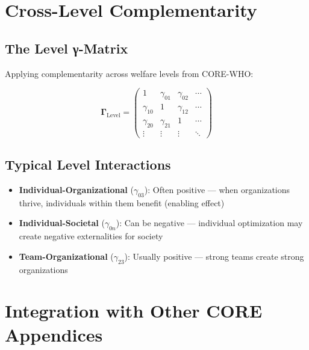 \section{Cross-Level Complementarity}
\label{sec:how-level}

\subsection{The Level γ-Matrix}

Applying complementarity across welfare levels from CORE-WHO:

\begin{equation}
\mathbf{\Gamma}_{\text{Level}} = \begin{pmatrix}
1 & \gamma_{01} & \gamma_{02} & \cdots \\
\gamma_{10} & 1 & \gamma_{12} & \cdots \\
\gamma_{20} & \gamma_{21} & 1 & \cdots \\
\vdots & \vdots & \vdots & \ddots
\end{pmatrix}
\end{equation}

\subsection{Typical Level Interactions}

\begin{itemize}
\item \textbf{Individual-Organizational} ($\gamma_{03}$): Often positive --- when
      organizations thrive, individuals within them benefit (enabling effect)
\item \textbf{Individual-Societal} ($\gamma_{0n}$): Can be negative --- individual
      optimization may create negative externalities for society
\item \textbf{Team-Organizational} ($\gamma_{23}$): Usually positive --- strong
      teams create strong organizations
\end{itemize}


\section{Integration with Other CORE Appendices}
\label{sec:how-integration}

